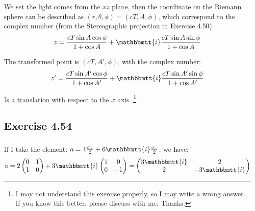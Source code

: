 \documentclass[]{ctexart}
\newcommand{\mi}{\mathbbmtt{i}}
\begin{document}
		\subsubsection{}
			We set the light comes from the $xz$ plane, then the coordinate on the Riemann sphere can be described as $(r,\theta,\phi)=(cT,A,\phi)$, which correspond to the complex number (from the Stereographic projection in Exercise 4.50) 
				\begin{equation*}
				\begin{aligned}
					z=\frac{cT\sin A \cos \phi}{1+\cos A }+\mi\frac{cT\sin A \sin \phi}{1+\cos A } 
				\end{aligned}
				\end{equation*}
			
			The transformed point is $(cT,A',\phi)$, with the complex number:
				\begin{equation*}
				\begin{aligned}
					z'=\frac{cT\sin A' \cos \phi}{1+\cos A' }+\mi\frac{cT\sin A' \sin \phi}{1+\cos A' }
				\end{aligned}
				\end{equation*}
			
			Is a translation with respect to the $x$ axis. 
			\footnote{I may not understand this exercise properly, so I may write a wrong answer. If you know this better, please discuss with me. Thanks. }
		
	\subsection{Exercise 4.54}
		\subsubsection{}
			If I take the element: $a=4\frac{\sigma_x}{2}+6\mi \frac{\sigma_z}{2}$, we have:
				\begin{equation*}
				\begin{aligned}
					a=
					2\begin{pmatrix}
						0 & 1\\
						1 & 0
					\end{pmatrix}
					+3\mi 
					\begin{pmatrix}
					1 & 0\\
					0 & -1
					\end{pmatrix}
					=
					\begin{pmatrix}
					3\mi & 2\\
					2 & -3\mi 
					\end{pmatrix}
				\end{aligned}
				\end{equation*}
			
\end{document}
